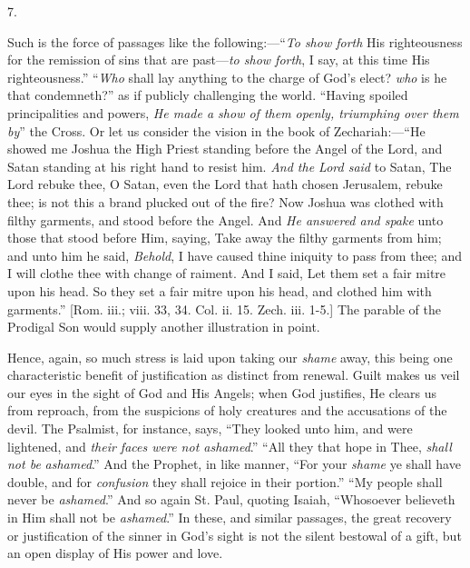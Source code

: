 7.

Such is the force of passages like the following:—``\emph{To
show forth} His righteousness for the remission of sins that are
past—\emph{to show forth}, I say, at this time His righteousness.'' ``\emph{Who} shall lay anything to the charge
of God's elect? \emph{who} is he that condemneth?'' as if publicly
challenging the world. ``Having spoiled principalities and powers,
\emph{He made a show of them openly, triumphing over them by}''
the Cross. Or let us consider the vision in the book of Zechariah:—``He
showed me Joshua the High Priest standing before the Angel of the
Lord, and Satan standing at his right hand to resist him. \emph{And the
Lord said} to Satan, The Lord rebuke thee, O Satan, even the Lord
that hath chosen Jerusalem, rebuke thee; is not this a brand plucked
out of the fire? Now Joshua was clothed with filthy garments, and
stood before the Angel. And \emph{He answered and spake} unto those
that stood before Him, saying, Take away the filthy garments from him;
and unto him he said, \emph{Behold}, I have caused thine iniquity to
pass from thee; and I will clothe thee with change of raiment. And I
said, Let them set a fair mitre upon his head. So they set a fair
mitre upon his head, and clothed him with garments.'' [Rom. iii.;
viii. 33, 34. Col. ii. 15. Zech. iii. 1-5.] The parable of the
Prodigal Son would supply another illustration in point.

Hence, again, so much stress is laid upon taking our \emph{shame}
away, this being one characteristic benefit of justification as
distinct from renewal. Guilt makes us veil our eyes in the sight of
God and His Angels; when God justifies, He clears us from reproach,
from the suspicions of holy creatures and the accusations of the
devil. The Psalmist, for instance, says, ``They looked unto him,
and were lightened, and \emph{their faces were not ashamed}.''
``All they that hope in Thee, \emph{shall not be} \emph{ashamed}.''
And the Prophet, in like manner, ``For your \emph{shame} ye shall
have double, and for \emph{confusion} they shall rejoice in their
portion.'' ``My people shall never be \emph{ashamed}.''
And so again St. Paul, quoting Isaiah, ``Whosoever believeth in Him
shall not be \emph{ashamed}.'' In these, and similar passages, the
great recovery or justification of the sinner in God's sight is not
the silent bestowal of a gift, but an open display of His power and
love.

